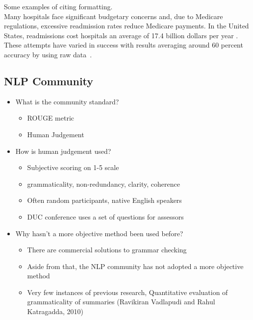\documentclass[12pt,a4paper]{article}
\begin{document}
Some examples of citing formatting.\\

Many hospitals face significant budgetary concerns and, due to Medicare regulations, excessive readmission rates reduce Medicare payments. In the United States, readmissions cost hospitals an average of 17.4 billion dollars per year \cite{catlin2008}. These attempts have varied in success with results averaging around 60 percent accuracy by using raw data~\cite{kansagara2011}. 

\subsection{NLP Community}
\begin{itemize}
   \item What is the community standard?
   \begin{itemize}
      \item ROUGE metric
      \item Human Judgement
   \end{itemize}
   \item How is human judgement used?
   \begin{itemize}
      \item Subjective scoring on 1-5 scale
      \item grammaticality, non-redundancy, clarity, coherence
      \item Often random participants, native English speakers
      \item DUC conference uses a set of questions for assessors
   \end{itemize}
      \item Why hasn't a more objective method been used before?
   \begin{itemize}
      \item There are commercial solutions to grammar checking
      \item Aside from that, the NLP community has not adopted a more objective method
      \item Very few instances of previous research, Quantitative evaluation of grammaticality of summaries (Ravikiran Vadlapudi and Rahul Katragadda, 2010)
   \end{itemize}
\end{itemize}

\end{document}
